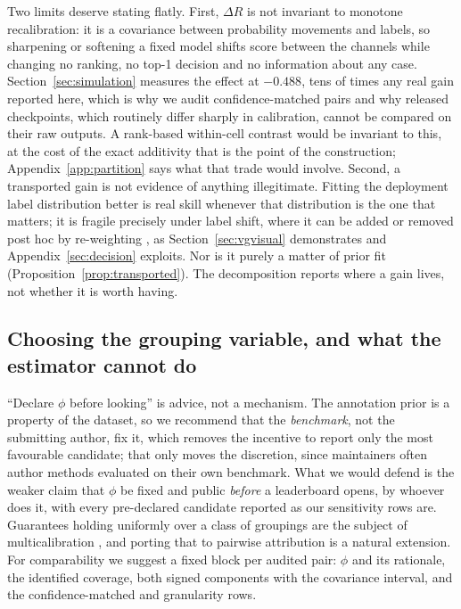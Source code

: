 Two limits deserve stating flatly. First, $\Delta R$ is not invariant to monotone
recalibration: it is a covariance between probability movements and labels, so sharpening or
softening a fixed model shifts score between the channels while changing no ranking, no
top-1 decision and no information about any case. Section~\ref{sec:simulation} measures the
effect at $-0.488$, tens of times any real gain reported here, which is why we audit
confidence-matched pairs and why released checkpoints, which routinely differ sharply in
calibration, cannot be compared on their raw outputs. A rank-based within-cell contrast
would be invariant to this, at the cost of the exact additivity that is the point of the
construction; Appendix~\ref{app:partition} says what that trade would involve. Second, a
transported gain is not evidence of anything illegitimate. Fitting the deployment label
distribution better is real skill whenever that distribution is the one that matters; it is
fragile precisely under label shift, where it can be added or removed post hoc by
re-weighting \citep{saerens2002adjusting,lipton2018detecting}, as
Section~\ref{sec:vgvisual} demonstrates and Appendix~\ref{sec:decision}
exploits. Nor is it purely a matter of prior fit
(Proposition~\ref{prop:transported}). The decomposition reports
where a gain lives, not whether it is worth having.

\subsection{Choosing the grouping variable, and what the estimator cannot do}

``Declare $\phi$ before looking'' is advice, not a mechanism. The annotation prior is a
property of the dataset, so we recommend that the \emph{benchmark}, not the submitting
author, fix it, which removes the incentive to report only the most favourable candidate;
that only moves the discretion, since maintainers often author methods evaluated on their
own benchmark. What we would defend is the weaker claim that
$\phi$ be fixed and public \emph{before} a leaderboard opens, by whoever does it, with every
pre-declared candidate reported as our sensitivity rows are. Guarantees holding uniformly over a class of groupings are the subject of multicalibration
\citep{hebert2018multicalibration}, and porting that to pairwise attribution is a natural
extension. For comparability we suggest a fixed block per audited pair: $\phi$ and its
rationale, the identified coverage, both signed components with the covariance interval, and
the confidence-matched and granularity rows.

